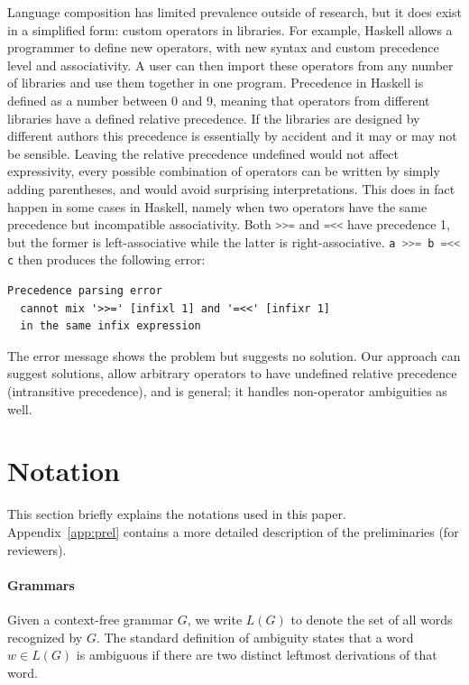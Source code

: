 \documentclass[runningheads]{llncs}
\newcommand{\haskell}{\lstinline[language=haskell]}
\begin{document}
Language composition has limited prevalence outside of research, but it does exist in a simplified form: custom operators in libraries. For example, Haskell allows a programmer to define new operators, with new syntax and custom precedence level and associativity. A user can then import these operators from any number of libraries and use them together in one program. Precedence in Haskell is defined as a number between 0 and 9, meaning that operators from different libraries have a defined relative precedence. If the libraries are designed by different authors this precedence is essentially by accident and it may or may not be sensible. Leaving the relative precedence undefined would not affect expressivity, every possible combination of operators can be written by simply adding parentheses, and would avoid surprising interpretations. This does in fact happen in some cases in Haskell, namely when two operators have the same precedence but incompatible associativity. Both \haskell{>>=} and \haskell{=<<} have precedence 1, but the former is left-associative while the latter is right-associative. \haskell{a >>= b =<< c} then produces the following error:

\begin{lstlisting}
Precedence parsing error
  cannot mix '>>=' [infixl 1] and '=<<' [infixr 1]
  in the same infix expression
\end{lstlisting}

\noindent The error message shows the problem but suggests no solution. Our approach can suggest solutions, allow arbitrary operators to have undefined relative precedence (intransitive precedence), and is general; it handles non-operator ambiguities as well.




\section{Notation}
\label{sec:prel}

This section briefly explains the notations used in this paper.
Appendix~\ref{app:prel} contains a more detailed description of
the preliminaries (for reviewers).


\paragraph{Grammars}
Given a context-free grammar $G$, we write $L(G)$ to denote the
set of all words recognized by $G$.
%
The standard definition of ambiguity states that a word
$w \in L(G)$ is ambiguous if there are two distinct leftmost
derivations of that word.
\end{document}
